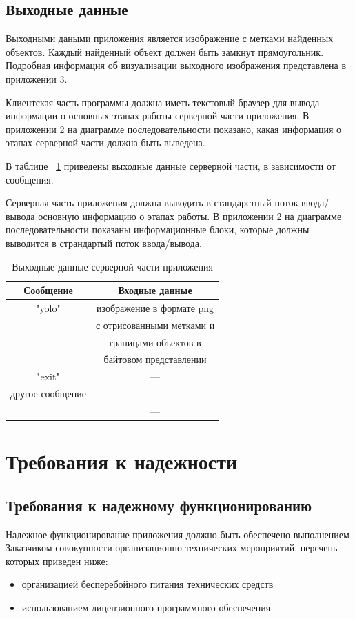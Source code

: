 \documentclass[a4paper,english]{G2-105}
\begin{document}
\subsection{Выходные данные}
\par Выходными даными приложения является изображение с метками найденных объектов. Каждый найденный объект должен быть замкнут прямоугольник. Подробная информация об визуализации выходного изображения представлена в приложении 3.
\par Клиентская часть программы должна иметь текстовый браузер для вывода информации о основных этапах работы серверной части приложения. В приложении 2 на диаграмме последовательности показано, какая информация о этапах серверной части должна быть выведена.
\par В таблице ~\ref{output} приведены выходные данные серверной части, в зависимости от сообщения.
\par Серверная часть приложения должна выводить в стандарстный поток ввода/вывода основную информацию о этапах работы. В приложении 2 на диаграмме последовательности показаны информационные блоки, которые должны выводится в страндартый поток ввода/вывода.
\begin{longtable}{|c|c|}
    \caption{Выходные данные серверной части приложения} \label{output} \\ \hline
    Сообщение        & Входные данные            \\ \hline \endhead
    "yolo"           & изображение в формате png \\ 
                     & с отрисованными метками и \\
                     & границами объектов в      \\
                     & байтовом представлении    \\ \hline
    "exit"           & ---                       \\ \hline
    другое сообщение & ---                       \\  
    	                 & ---                       \\
\end{longtable}

\section{Требования к надежности}
\subsection{Требования к надежному функционированию}
Надежное функционирование приложения должно быть обеспечено выполнением Заказчиком совокупности организационно-технических мероприятий, перечень которых приведен ниже:
\begin{itemize}
\item организацией бесперебойного питания технических средств
\item использованием лицензионного программного обеспечения
\end{itemize}
\end{document}
